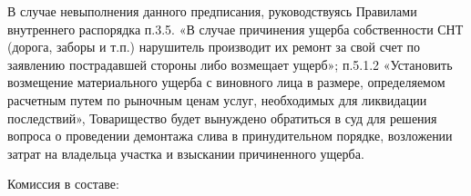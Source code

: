 В случае невыполнения данного предписания, руководствуясь Правилами внутреннего распорядка п.3.5. «В случае причинения ущерба собственности СНТ (дорога, заборы и т.п.) нарушитель производит их ремонт за свой счет по заявлению пострадавшей стороны либо возмещает ущерб»; п.5.1.2 «Установить возмещение материального ущерба с виновного лица в размере, определяемом расчетным путем по рыночным ценам услуг, необходимых для ликвидации последствий», Товарищество будет вынуждено обратиться в суд для решения вопроса о проведении демонтажа слива в принудительном порядке, возложении затрат на владельца участка и взыскании причиненного ущерба.


\vspace{3mm}



\vspace{3mm}
\noindent Комиссия в составе:\\

